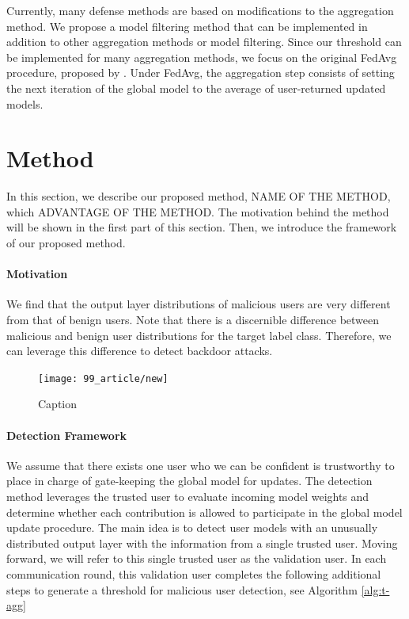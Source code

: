 \documentclass{article} %
\newcommand{\yli}[1]{{\color{cyan}#1}}
\begin{document}
Currently, many defense methods are based on modifications to the aggregation method. We propose a model filtering method that can be implemented in addition to other aggregation methods or model filtering. Since our threshold can be implemented for many aggregation methods, we focus on the original FedAvg procedure, proposed by \cite{fedavg}. Under FedAvg, the aggregation step consists of setting the next iteration of the global model to the average of user-returned updated models. 


%
\section{Method}

\yli{In this section, we describe our proposed method, NAME OF THE METHOD, which ADVANTAGE OF THE METHOD. The motivation behind the method will be shown in the first part of this section. Then, we introduce the framework of our proposed method.}

\paragraph{Motivation}

We find that the output layer distributions of malicious users are very different from that of benign users. Note that there is a discernible difference between malicious and benign user distributions for the target label class. Therefore, we can leverage this difference to detect backdoor attacks.

\begin{figure}
    \centering
    \texttt{[image: 99\_article/new]}
    \caption{Caption}
    \label{fig:my_label}
\end{figure}

\paragraph{Detection Framework}

We assume that there exists one user who we can be confident is trustworthy to place in charge of gate-keeping the global model for updates. The detection method leverages the trusted user to evaluate incoming model weights and determine whether each contribution is allowed to participate in the global model update procedure. The main idea is to detect user models with an unusually distributed output layer with the information from a single trusted user. Moving forward, we will refer to this single trusted user as the validation user. In each communication round, this validation user completes the following additional steps to generate a threshold for malicious user detection, see Algorithm \ref{alg:t-agg}
\end{document}

